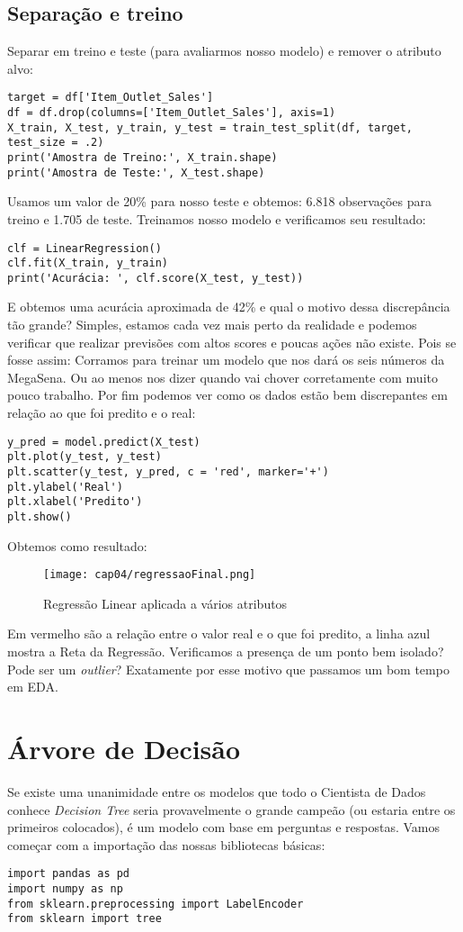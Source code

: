 \subsection{Separação e treino}
Separar em treino e teste (para avaliarmos nosso modelo) e remover o atributo alvo:
\begin{lstlisting}[]
target = df['Item_Outlet_Sales']
df = df.drop(columns=['Item_Outlet_Sales'], axis=1)
X_train, X_test, y_train, y_test = train_test_split(df, target, test_size = .2)
print('Amostra de Treino:', X_train.shape)
print('Amostra de Teste:', X_test.shape)
\end{lstlisting}

Usamos um valor de 20\% para nosso teste e obtemos: 6.818 observações para treino e 1.705 de teste. Treinamos nosso modelo e verificamos seu resultado:
\begin{lstlisting}[]
clf = LinearRegression()
clf.fit(X_train, y_train)
print('Acurácia: ', clf.score(X_test, y_test))
\end{lstlisting}

E obtemos uma acurácia aproximada de 42\% e qual o motivo dessa discrepância tão grande? Simples, estamos cada vez mais perto da realidade e podemos verificar que realizar previsões com altos scores e poucas ações não existe. Pois se fosse assim: Corramos para treinar um modelo que nos dará os seis números da MegaSena. Ou ao menos nos dizer quando vai chover corretamente com muito pouco trabalho. Por fim podemos ver como os dados estão bem discrepantes em relação ao que foi predito e o real:
\begin{lstlisting}[]
y_pred = model.predict(X_test)
plt.plot(y_test, y_test)
plt.scatter(y_test, y_pred, c = 'red', marker='+')
plt.ylabel('Real')
plt.xlabel('Predito')
plt.show()
\end{lstlisting}

Obtemos como resultado:
\begin{figure}[H]
	\centering
	\texttt{[image: cap04/regressaoFinal.png]}
	\caption{Regressão Linear aplicada a vários atributos}
\end{figure}

Em vermelho são a relação entre o valor real e o que foi predito, a linha azul mostra a Reta da Regressão. Verificamos a presença de um ponto bem isolado? Pode ser um \textit{outlier}? Exatamente por esse motivo que passamos um bom tempo em EDA.

\section{Árvore de Decisão}
Se existe uma unanimidade entre os modelos que todo o Cientista de Dados conhece \textit{Decision Tree} seria provavelmente o grande campeão (ou estaria entre os primeiros colocados), é um modelo com base em perguntas e respostas. Vamos começar com a importação das nossas bibliotecas básicas:
\begin{lstlisting}[]
import pandas as pd
import numpy as np
from sklearn.preprocessing import LabelEncoder
from sklearn import tree
\end{lstlisting}

